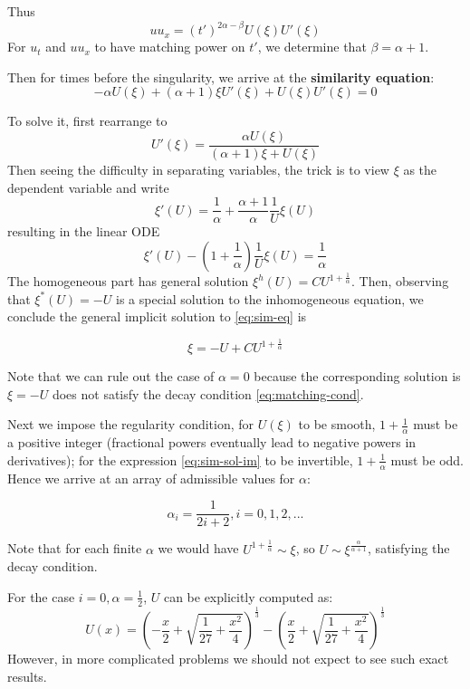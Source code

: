\documentclass[11pt,a4paper]{article}
\begin{document}
Thus $$uu_x = (t')^{2\alpha-\beta}U(\xi)U'(\xi)$$ For $u_t$ and $uu_x$ to have matching power on $t'$, we determine that $\beta = \alpha+1$. 

Then for times before the singularity, we arrive at the \textbf{similarity equation}:
\begin{equation}\label{eq:sim-eq}
    -\alpha U(\xi) + (\alpha+1)\xi U'(\xi) + U(\xi) U'(\xi) = 0
\end{equation}

To solve it, first rearrange to 
$$U'(\xi) = \frac{\alpha U(\xi)}{(\alpha+1)\xi + U(\xi)}$$ 
Then seeing the difficulty in separating variables, the trick is to view $\xi$ as the dependent variable and write 
$$\xi'(U) = \frac{1}{\alpha} + \frac{\alpha+1}{\alpha}\frac{1}{U}\xi(U)$$ 
resulting in the linear ODE 
$$\xi'(U) - (1+\frac{1}{\alpha})\frac{1}{U}\xi(U) = \frac{1}{\alpha}$$ 
The homogeneous part has general solution $\xi^h(U) = CU^{1+\frac{1}{\alpha}}$. Then, observing that $\xi^*(U) = -U$ is a special solution to the inhomogeneous equation, we conclude the general implicit solution to \ref{eq:sim-eq} is 

\begin{equation}\label{eq:sim-sol-im}
    \xi = -U + CU^{1+\frac{1}{\alpha}}
\end{equation}

Note that we can rule out the case of $\alpha = 0$ because the corresponding solution is $\xi = -U$ does not satisfy the decay condition \ref{eq:matching-cond}.

Next we impose the regularity condition, for $U(\xi)$ to be smooth, $1+\frac{1}{\alpha}$ must be a positive integer (fractional powers eventually lead to negative powers in derivatives); for the expression \ref{eq:sim-sol-im} to be invertible, $1+\frac{1}{\alpha}$ must be odd. Hence we arrive at an array of admissible values for $\alpha$:

\begin{equation}
    \alpha_i = \frac{1}{2i+2}, i = 0,1,2,...
\end{equation}

Note that for each finite $\alpha$ we would have $U^{1+\frac{1}{\alpha}}\sim \xi$, so $U\sim \xi^{\frac{\alpha}{\alpha+1}}$, satisfying the decay condition.

For the case $i = 0, \alpha = \frac{1}{2}$, $U$ can be explicitly computed as:
\begin{equation}\label{eq:exact-profile}
    U(x) = \left(-\frac{x}{2} + \sqrt{\frac{1}{27}+\frac{x^2}{4}}\right)^{\frac{1}{3}} - \left(\frac{x}{2} + \sqrt{\frac{1}{27}+\frac{x^2}{4}}\right)^{\frac{1}{3}} 
\end{equation}
However, in more complicated problems we should not expect to see such exact results.
\end{document}
